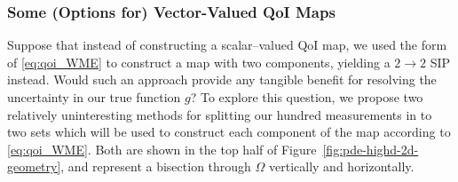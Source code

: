 \FloatBarrier
\subsubsection{Some (Options for) Vector-Valued QoI Maps}

Suppose that instead of constructing a scalar--valued QoI map, we used the form of \eqref{eq:qoi_WME} to construct a map with two components, yielding a $2 \rightarrow 2$ SIP instead.
Would such an approach provide any tangible benefit for resolving the uncertainty in our true function $g$?
To explore this question, we propose two relatively uninteresting methods for splitting our hundred measurements in to two sets which will be used to construct each component of the map according to \eqref{eq:qoi_WME}.
Both are shown in the top half of Figure~\ref{fig:pde-highd-2d-geometry}, and represent a bisection through $\Omega$ vertically and horizontally.


